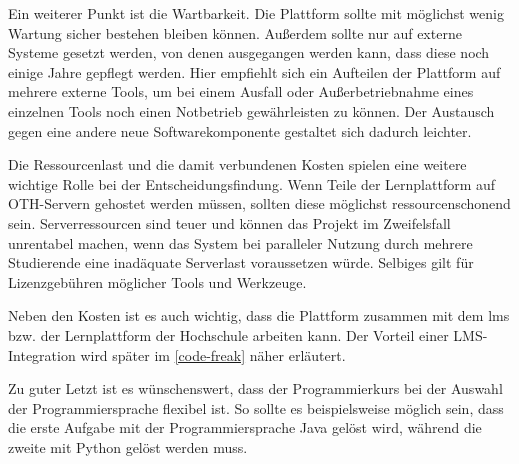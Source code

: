 Ein weiterer Punkt ist die Wartbarkeit. Die Plattform sollte mit möglichst wenig
Wartung sicher bestehen bleiben können. Außerdem sollte nur auf externe Systeme
gesetzt werden, von denen ausgegangen werden kann, dass diese noch einige Jahre
gepflegt werden. Hier empfiehlt sich ein Aufteilen der Plattform auf mehrere
externe Tools, um bei einem Ausfall oder Außerbetriebnahme eines einzelnen Tools
noch einen Notbetrieb gewährleisten zu können. Der Austausch gegen eine andere
neue Softwarekomponente gestaltet sich dadurch leichter.

Die Ressourcenlast und die damit verbundenen Kosten spielen eine weitere
wichtige Rolle bei der Entscheidungsfindung. Wenn Teile der Lernplattform auf
OTH-Servern gehostet werden müssen, sollten diese möglichst ressourcenschonend
sein. Serverressourcen sind teuer und können das Projekt im Zweifelsfall
unrentabel machen, wenn das System bei paralleler Nutzung durch mehrere
Studierende eine inadäquate Serverlast voraussetzen würde. Selbiges gilt für
Lizenzgebühren möglicher Tools und Werkzeuge.

Neben den Kosten ist es auch wichtig, dass die Plattform zusammen mit dem
\ac{lms} bzw. der Lernplattform der Hochschule arbeiten kann. Der Vorteil einer
LMS-Integration wird später im \autoref{code-freak} näher erläutert.

Zu guter Letzt ist es wünschenswert, dass der Programmierkurs bei der Auswahl
der Programmiersprache flexibel ist. So sollte es beispielsweise möglich sein,
dass die erste Aufgabe mit der Programmiersprache Java gelöst wird,
während die zweite mit Python gelöst werden muss.